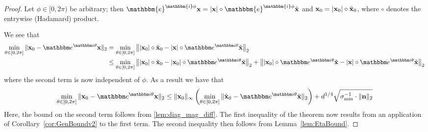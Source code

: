 \begin{proof}

Let $\phi \in [0,2 \pi)$ be arbitrary;  %
then $\mathbbm{e}^{\mathbbm{i} \phi }\x = |\x| \circ \mathbbm{e}^{\mathbbm{i} \phi} \tilde{\x}$ and $\mathbf x_0 = |\mathbf x_0| \circ \tilde{\mathbf x}_0$, where $\circ$ denotes the entrywise (Hadamard) product.

We see that%
\begin{align*}
\mintheta \| \x_0 - \eit\x \|_2 &= \min_{\theta \in [0, 2 \pi]} \left\| |\x_0| \circ \tilde{\x}_0 - |\x| \circ \eit \tilde{\x} \right\|_2 \\
&\leq \mintheta \left\| |\x_0| \circ \tilde{\x}_0 - |\x_0| \circ \eit \tilde{\x}  \right\|_2 + \left\| |\x_0| \circ \eit \tilde{\x}  - |\x| \circ \eit \tilde{\x}  \right\|_2 
\end{align*}
where the second term is now independent of $\phi$.  As a result we have that
\begin{equation*}
  \mintheta \| \x_0 - \eit \x \|_2 \leq \| \x_0 \|_{\infty} \left( \mintheta \| \tilde{\x}_0 - \eit \tilde{\x} \|_2 \right) + d^{1/4} \sqrt{\sigma_{\min}^{-1} \cdot \| \n \|_2 }
\end{equation*}
Here, the bound on the second term follows from \cref{lem:diag_mag_diff}.
%
%
The first inequality of the theorem now results from an application of Corollary~\ref{cor:GenBoundv2} to the first term.  The second inequality then follows from Lemma~\ref{lem:EtaBound}.
\end{proof}

